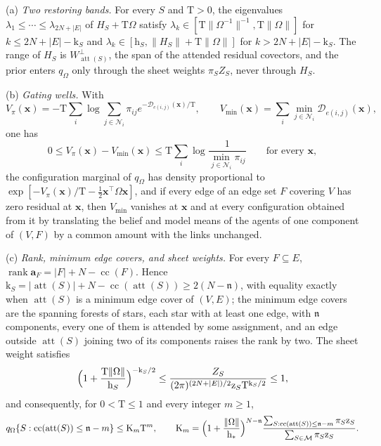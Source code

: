 (a) \emph{Two restoring bands.} For every \(S\) and \(\mathrm T>0\), the
eigenvalues \(\lambda_1\le\cdots\le\lambda_{2N+|E|}\) of \(H_S+\mathrm T\Omega\)
satisfy \(\lambda_k\in[\mathrm T\|\Omega^{-1}\|^{-1},\mathrm T\|\Omega\|]\) for
\(k\le2N+|E|-\mathrm k_S\) and
\(\lambda_k\in[\mathrm h_S,\|H_S\|+\mathrm T\|\Omega\|]\) for
\(k>2N+|E|-\mathrm k_S\). The range of \(H_S\) is
\(W_{\operatorname{att}(S)}^\perp\), the span of the attended residual
covectors, and the prior enters \(q_\Omega\) only through the sheet weights
\(\pi_SZ_S\), never through \(H_S\).

(b) \emph{Gating wells.} With
\[
V_\pi(\mathbf x)=-\mathrm T\sum_i\log\sum_{j\in\mathcal N_i}\pi_{ij}e^{-\mathcal D_{e(i,j)}(\mathbf x)/\mathrm T},
\qquad
V_{\min}(\mathbf x)=\sum_i\min_{j\in\mathcal N_i}\mathcal D_{e(i,j)}(\mathbf x),
\]
one has
\begin{equation}
0\le V_\pi(\mathbf x)-V_{\min}(\mathbf x)
\le\mathrm T\sum_i\log\frac1{\min_{j\in\mathcal N_i}\pi_{ij}}
\qquad\text{for every }\mathbf x,
\label{eq:rg-gated-well-depth}
\end{equation}
the configuration marginal of \(q_\Omega\) has density proportional to
\(\exp[-V_\pi(\mathbf x)/\mathrm T-\tfrac12\mathbf x^\top\Omega\mathbf x]\),
and if every edge of an edge set \(F\) covering \(V\) has zero residual at
\(\mathbf x\), then \(V_{\min}\) vanishes at \(\mathbf x\) and at every
configuration obtained from it by translating the belief and model means of
the agents of one component of \((V,F)\) by a common amount with the links
unchanged.

(c) \emph{Rank, minimum edge covers, and sheet weights.} For every
\(F\subseteq E\), \(\operatorname{rank}\mathbf a_F=|F|+N-\operatorname{cc}(F)\).
Hence \(\mathrm k_S=|\operatorname{att}(S)|+N-\operatorname{cc}(\operatorname{att}(S))\ge2(N-\mathfrak n)\),
with equality exactly when \(\operatorname{att}(S)\) is a minimum edge cover
of \((V,E)\); the minimum edge covers are the spanning forests of stars, each
star with at least one edge, with \(\mathfrak n\) components, every one of them is attended by some
assignment, and an edge outside \(\operatorname{att}(S)\) joining two of its
components raises the rank by two. The sheet weight satisfies
\begin{equation}
\Bigl(1+\frac{\mathrm T\|\Omega\|}{\mathrm h_S}\Bigr)^{-\mathrm k_S/2}
\le\frac{Z_S}{(2\pi)^{(2N+|E|)/2}\mathrm z_S\mathrm T^{\mathrm k_S/2}}\le1,
\label{eq:rg-gated-sheet-weight}
\end{equation}
and consequently, for \(0<\mathrm T\le1\) and every integer \(m\ge1\),
\begin{equation}
q_\Omega\{S:\operatorname{cc}(\operatorname{att}(S))\le\mathfrak n-m\}\le\mathrm K_m\mathrm T^m,
\qquad
\mathrm K_m=\Bigl(1+\frac{\|\Omega\|}{\mathrm h_*}\Bigr)^{N-\mathfrak n}
\frac{\sum_{S:\operatorname{cc}(\operatorname{att}(S))\le\mathfrak n-m}\pi_S\mathrm z_S}
{\sum_{S\in\mathcal M}\pi_S\mathrm z_S}.
\label{eq:rg-gated-merge-cost}
\end{equation}

